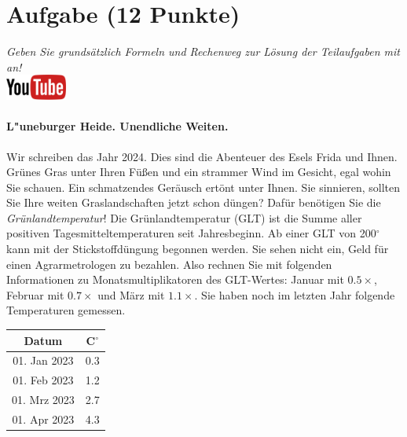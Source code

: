 \documentclass[a4paper, 9pt]{scrartcl}\usepackage[]{graphicx}\usepackage[]{xcolor}
\begin{document}
\clearpage

\section{Aufgabe \hfill (12 Punkte)}

\textit{Geben Sie grunds{\"a}tzlich Formeln und Rechenweg zur L{\"o}sung der
  Teilaufgaben mit an!} \\[1Ex]

\hfill\href{https://youtu.be/fiWGgCX-cE4}{\includegraphics[width =
  2cm]{img/youtube}} %
\hspace{2Ex}



\paragraph{L{"u}neburger Heide. Unendliche Weiten.}



Wir schreiben das Jahr 2024. Dies sind die Abenteuer
des Esels Frida und Ihnen. Gr{\"u}nes Gras unter Ihren F{\"u}{\ss}en und
ein strammer Wind im Gesicht, egal wohin Sie schauen. Ein schmatzendes
Ger{\"a}usch ert{\"o}nt unter Ihnen. Sie sinnieren, sollten Sie Ihre weiten
Graslandschaften jetzt schon d{\"u}ngen?  Daf{\"u}r ben{\"o}tigen Sie die
\textit{Gr{\"u}nlandtemperatur}! Die Gr{\"u}nlandtemperatur (GLT) ist die Summe aller
positiven Tagesmitteltemperaturen seit Jahresbeginn. Ab einer GLT von
200$^\circ$ kann mit der Stickstoffd{\"u}ngung begonnen werden. Sie sehen nicht
ein, Geld f{\"u}r einen Agrarmetrologen zu bezahlen. Also rechnen Sie mit
folgenden Informationen zu Monatsmultiplikatoren des GLT-Wertes: Januar mit
$0.5\times$, Februar mit $0.7\times$ und M{\"a}rz mit
$1.1\times$. Sie haben noch im letzten Jahr folgende Temperaturen
gemessen.

\begin{center}
\begin{tabular}{cc}
  \toprule
  Datum & C$^\circ$ \\
  \midrule
  01. Jan 2023 & 0.3\\
  01. Feb 2023 & 1.2\\
  01. Mrz 2023 & 2.7\\
  01. Apr 2023 & 4.3\\
  \bottomrule
\end{tabular}
\end{center}
\end{document}
